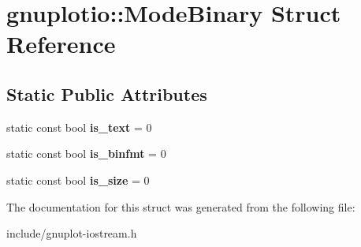 \hypertarget{structgnuplotio_1_1ModeBinary}{}\section{gnuplotio\+:\+:Mode\+Binary Struct Reference}
\label{structgnuplotio_1_1ModeBinary}
\subsection*{Static Public Attributes}
\begin{DoxyCompactItemize}
\item 
\mbox{\label{structgnuplotio_1_1ModeBinary_ac89064b5df24f7ef4d765fdfde4fd1b6}} 
static const bool {\bfseries is\+\_\+text} = 0
\item 
\mbox{\label{structgnuplotio_1_1ModeBinary_aee724034dc3372b8e12b1187507bf136}} 
static const bool {\bfseries is\+\_\+binfmt} = 0
\item 
\mbox{\label{structgnuplotio_1_1ModeBinary_a6eae25ea662362bbb88bc987d6025290}} 
static const bool {\bfseries is\+\_\+size} = 0
\end{DoxyCompactItemize}


The documentation for this struct was generated from the following file\+:\begin{DoxyCompactItemize}
\item 
include/gnuplot-\/iostream.\+h\end{DoxyCompactItemize}
